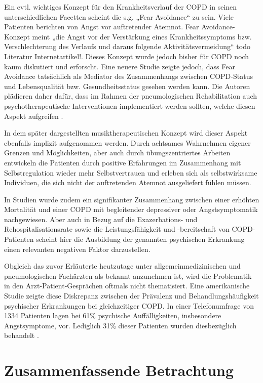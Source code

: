 Ein evtl. wichtiges Konzept für den Krankheitsverlauf der COPD in seinen unterschiedlichen Facetten scheint die s.g. „Fear Avoidance“ zu sein. Viele Patienten berichten von Angst vor auftretender Atemnot. Fear Avoidance- Konzept meint „die Angst vor der Verstärkung eines Krankheitssymptoms bzw. Verschlechterung des Verlaufs und daraus folgende Aktivitätsvermeidung“ \autocite{stenzel20013} todo Literatur Internetartikel!. Dieses Konzept wurde jedoch bisher für COPD noch kaum diskutiert und erforscht. Eine neuere Studie zeigte jedoch, dass Fear Avoidance tatsächlich als Mediator des Zusammenhangs zwischen COPD-Status und Lebensqualität bzw. Gesundheitsstatus gesehen werden kann. Die Autoren plädieren daher dafür, dass im Rahmen der pneumologischen Rehabilitation auch psychotherapeutische Interventionen implementiert werden sollten, welche diesen Aspekt aufgreifen \autocite{stenzel20013}. 

In dem später dargestellten musiktherapeutischen Konzept wird dieser Aspekt ebenfalls implizit aufgenommen werden. Durch achtsames Wahrnehmen eigener Grenzen und Möglichkeiten, aber auch durch übungszentriertes Arbeiten entwickeln die Patienten durch positive Erfahrungen im Zusammenhang mit Selbstregulation wieder mehr Selbstvertrauen und erleben sich als selbstwirksame Individuen, die sich nicht der auftretenden Atemnot ausgeliefert fühlen müssen.

In Studien wurde zudem ein signifikanter Zusammenhang zwischen einer erhöhten Mortalität und einer COPD mit begleitender depressiver oder Angstsymptomatik nachgewiesen. Aber auch in Bezug auf die Exazerbations- und Rehospitalisationsrate sowie die Leistungsfähigkeit und -bereitschaft von COPD-Patienten scheint hier die Ausbildung der genannten psychischen Erkrankung einen relevanten negativen Faktor darzustellen\autocite[vgl.]{kenn2011}.

Obgleich das zuvor Erläuterte heutzutage unter allgemeinmedizinischen und pneumologischen Fachärzten als bekannt anzunehmen ist, wird die Problematik in den Arzt-Patient-Gesprächen oftmals nicht thematisiert. Eine amerikanische Studie zeigte diese Diskrepanz zwischen der Prävalenz und Behandlungshäufigkeit psychischer Erkrankungen bei gleichzeitiger COPD. In einer Telefonumfrage von 1334 Patienten lagen bei 61\% psychische Auffälligkeiten, insbesondere Angstsymptome, vor. Lediglich 31\% dieser Patienten wurden diesbezüglich behandelt \autocite[vgl.][156]{fischer2007}.


\section{Zusammenfassende Betrachtung}
\label{zusammenfassende betrachtung}

\newpage\thispagestyle{empty}